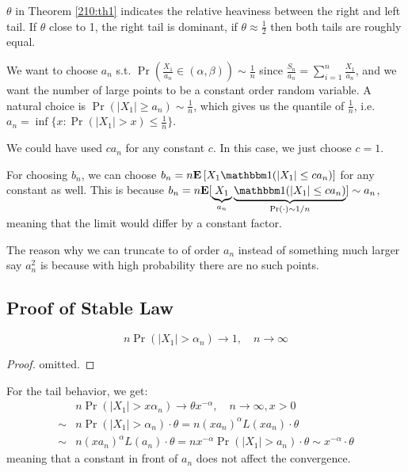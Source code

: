 \documentclass[../main/main.tex]{subfiles}
\begin{document}
\begin{remark}
	$\theta$ in Theorem \ref{210:th1} indicates the relative heaviness between the right and left tail. If $\theta $ close to 1, the right tail is dominant, if $\theta \approx \frac{1}{2}$ then both tails are roughly equal.
\end{remark}
We want to choose $a_n$ s.t. $\Pr\left(\frac{X_1}{a_n}\in(\alpha,\beta)\right)\sim \frac{1}{n}$ since $\frac{S_n}{a_n}=\sum\limits_{i=1}^{n} \frac{X_1}{a_n}$, and we want the number of large points to be a constant order random variable. A natural choice is $\Pr(|X_1| \geq a_n) \sim \frac{1}{n}$, which gives us the quantile of $\frac{1}{n}$, i.e. $a_n = \inf \{x: \Pr(|X_1|>x)\leq \frac{1}{n}\}$.
\begin{remark}
	We could have used $ca_n$ for any constant $c$. In this case, we just choose $c=1$.
\end{remark}

For choosing $b_n$, we can choose $b_n= n \E \left[ X_1 \ind(|X_1|\leq ca_n) \right]$ for any constant as well. This is because $b_n = n \E [ \underbrace{X_1}_{a_n} \underbrace{\ind(|X_1|\leq ca_n)}_{\Pr(\cdot)\sim 1 / n}] \sim a_n$, meaning that the limit would differ by a constant factor.

\begin{remark}
	The reason why we can truncate to of order $a_n$ instead of something much larger say $a^2_n$ is because with high probability there are no such points.
\end{remark}

\subsection{Proof of Stable Law}

\begin{claim}
	\[
		n\Pr(|X_1| > \alpha_n) \to 1, \quad n \to \infty
	\]
\end{claim}
\begin{proof} omitted.
\end{proof}
For the tail behavior, we get:
\begin{align*}
	     & n\Pr(|X_1| > x\alpha_n) \to \theta x^{-\alpha}, \quad n \to \infty, x > 0                                         \\
	\sim & n\Pr(|X_1| > \alpha_n)\cdot \theta = n(x a_n)^{\alpha} L(x a_n) \cdot \theta                                      \\
	\sim & n(x a_n)^{\alpha} L(a_n) \cdot \theta = n x^{-\alpha} \Pr(|X_1| > a_n) \cdot \theta \sim x^{-\alpha} \cdot \theta
\end{align*}
meaning that a constant in front of $a_n$ does not affect the convergence.\\
\end{document}
